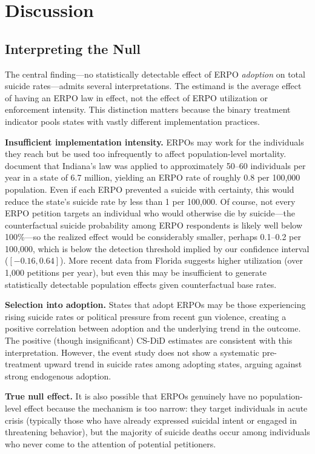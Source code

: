 \documentclass[12pt]{article}
\begin{document}
\section{Discussion}

\subsection{Interpreting the Null}

The central finding---no statistically detectable effect of ERPO \textit{adoption} on total suicide rates---admits several interpretations. The estimand is the average effect of having an ERPO law in effect, not the effect of ERPO utilization or enforcement intensity. This distinction matters because the binary treatment indicator pools states with vastly different implementation practices.

\textbf{Insufficient implementation intensity.} ERPOs may work for the individuals they reach but be used too infrequently to affect population-level mortality. \citet{swanson2019criminal} document that Indiana's law was applied to approximately 50--60 individuals per year in a state of 6.7 million, yielding an ERPO rate of roughly 0.8 per 100,000 population. Even if each ERPO prevented a suicide with certainty, this would reduce the state's suicide rate by less than 1 per 100,000. Of course, not every ERPO petition targets an individual who would otherwise die by suicide---the counterfactual suicide probability among ERPO respondents is likely well below 100\%---so the realized effect would be considerably smaller, perhaps 0.1--0.2 per 100,000, which is below the detection threshold implied by our confidence interval ($[-0.16, 0.64]$). More recent data from Florida suggests higher utilization (over 1,000 petitions per year), but even this may be insufficient to generate statistically detectable population effects given counterfactual base rates.

\textbf{Selection into adoption.} States that adopt ERPOs may be those experiencing rising suicide rates or political pressure from recent gun violence, creating a positive correlation between adoption and the underlying trend in the outcome. The positive (though insignificant) CS-DiD estimates are consistent with this interpretation. However, the event study does not show a systematic pre-treatment upward trend in suicide rates among adopting states, arguing against strong endogenous adoption.

\textbf{True null effect.} It is also possible that ERPOs genuinely have no population-level effect because the mechanism is too narrow: they target individuals in acute crisis (typically those who have already expressed suicidal intent or engaged in threatening behavior), but the majority of suicide deaths occur among individuals who never come to the attention of potential petitioners.
\end{document}
